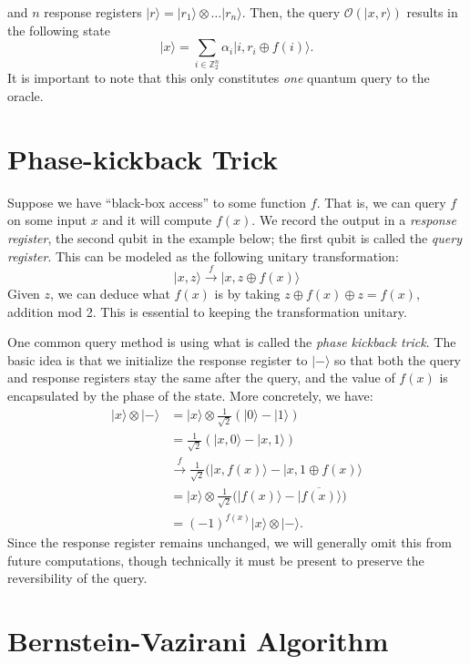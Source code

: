 \documentclass[12pt,twoside]{reedthesis}
\newcommand{\Z}{\mathbb{Z}}
\newcommand{\ketz}{\ensuremath{\lvert 0\rangle}\xspace}
\newcommand{\keto}{\ensuremath{\lvert 1\rangle}\xspace}
\newcommand{\ket}[1]{\ensuremath{\lvert #1\rangle}\xspace}
\newcommand{\Hminus}{\ensuremath{\lvert- \rangle}\xspace}
\begin{document}
and $n$ response registers $\ket{r} = \ket{r_1} \otimes \ldots \ket{r_n}$. Then, the query $\mathcal{O}(\ket{x, r})$ results in the following state
\begin{equation*}
\ket{x} = \sum_{i \in \Z_2^n} \alpha_i \ket{i, r_i \oplus f(i)}.
\end{equation*}
It is important to note that this only constitutes \textit{one} quantum query to the oracle.


\section{Phase-kickback Trick}

Suppose we have ``black-box access'' to some function $f$. That is, we can query $f$ on some input $x$ and it will compute $f(x)$. We record the output in a \textit{response register}, the second qubit in the example below; the first qubit is called the \textit{query register}. This can be modeled as the following unitary transformation:
\begin{equation*}
\ket{x, z} \xrightarrow{f} \ket{x, z \oplus f(x)}
\end{equation*}
Given $z$, we can deduce what $f(x)$ is by taking $z \oplus f(x) \oplus z = f(x)$, addition mod 2. This is essential to keeping the transformation unitary. 

One common query method is using what is called the \textit{phase kickback trick}. The basic idea is that we initialize the response register to \Hminus so that both the query and response registers stay the same after the query, and the value of $f(x)$ is encapsulated by the phase of the state. More concretely, we have:
\begin{align*}
\ket{x} \otimes \Hminus 
& = \ket{x} \otimes \frac{1}{\sqrt{2}}(\ketz - \keto)\\
& = \frac{1}{\sqrt{2}}(\ket{x, 0} - \ket{x, 1}) \\
& \xrightarrow{f} \frac{1}{\sqrt{2}}(\ket{x, f(x)} - \ket{x, 1 \oplus f(x)} \\
& = \ket{x} \otimes \frac{1}{\sqrt{2}}\bigg(\ket{f(x)} - \ket{\overline{f(x)}}\bigg) \\
& = (-1)^{f(x)} \ket{x} \otimes \ket{ -}.
\end{align*}
Since the response register remains unchanged, we will generally omit this from future computations, though technically it must be present to preserve the reversibility of the query. 
\section{Bernstein-Vazirani Algorithm}
\end{document}
